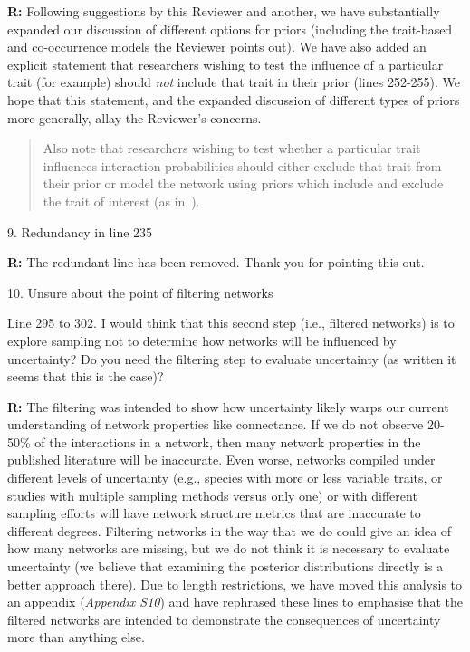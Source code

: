 \documentclass[12pt]{letter}
\newenvironment{refquote}{\bigskip \begin{it}}{\end{it}\smallskip}
\begin{document}
		\textbf{R:} Following suggestions by this Reviewer and another, we have substantially expanded our discussion of different options for priors (including the trait-based and co-occurrence models the Reviewer points out). We have also added an explicit statement that researchers wishing to test the influence of a particular trait (for example) should \emph{not} include that trait in their prior (lines 252-255). We hope that this statement, and the expanded discussion of different types of priors more generally, allay the Reviewer's concerns. 


		\begin{quotation}
			Also note that researchers wishing to test whether a particular trait influences interaction probabilities should either exclude that trait from their prior or model the network using priors which include and exclude the trait of interest (as in~\citet{Weinstein2017,Weinstein2017a}).
		\end{quotation}


	9. Redundancy in line 235


		\textbf{R:} The redundant line has been removed. Thank you for pointing this out.


	10. Unsure about the point of filtering networks 


		\begin{refquote}
		Line 295 to 302.  I would think that this second step (i.e., filtered networks) is to explore sampling not to determine how networks will be influenced by uncertainty?  Do you need the filtering step to evaluate uncertainty (as written it seems that this is the case)?
		\end{refquote}


		\textbf{R:} The filtering was intended to show how uncertainty likely warps our current understanding of network properties like connectance. If we do not observe 20-50\% of the interactions in a network, then many network properties in the published literature will be inaccurate. Even worse, networks compiled under different levels of uncertainty (e.g., species with more or less variable traits, or studies with multiple sampling methods versus only one) or with different sampling efforts will have network structure metrics that are inaccurate to different degrees. Filtering networks in the way that we do could give an idea of how many networks are missing, but we do not think it is necessary to evaluate uncertainty (we believe that examining the posterior distributions directly is a better approach there). Due to length restrictions, we have moved this analysis to an appendix (\emph{Appendix S10}) and have rephrased these lines to emphasise that the filtered networks are intended to demonstrate the consequences of uncertainty more than anything else.
\end{document}
